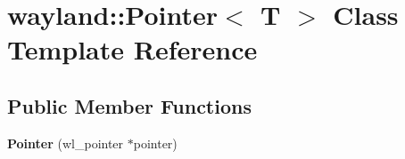 \hypertarget{classwayland_1_1Pointer}{}\section{wayland\+::Pointer$<$ T $>$ Class Template Reference}
\label{classwayland_1_1Pointer}
\subsection*{Public Member Functions}
\begin{DoxyCompactItemize}
\item 
\mbox{\label{classwayland_1_1Pointer_a0131d01952e081c5c95fd0595980c8c5}} 
{\bfseries Pointer} (wl\+\_\+pointer $\ast$pointer)
\end{DoxyCompactItemize}

